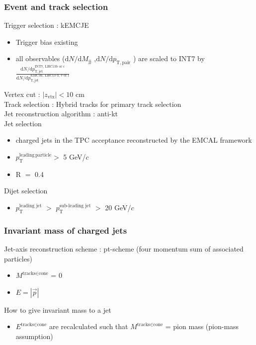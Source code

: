 \begin{frame}
\frametitle{Event and track selection}
Trigger selection : kEMCJE 
\begin{itemize}
\item Trigger bias existing
\item all observables ($\mathrm{d}N/\mathrm{d}M_\mathrm{jj}$ ,$\mathrm{d}N/\mathrm{d}p_\mathrm{T,pair}$ ) are scaled to INT7 by $\frac{\mathrm{d}N/\mathrm{d}p_\mathrm{T,jet}^{\textrm{INT7, LHC13b or c}}}{\mathrm{d}N/\mathrm{d}p_\mathrm{T,jet}^{\textrm{EMCJE, LHC13 d, e or f}}}$
\end{itemize}
Vertex cut : $|z_\mathrm{vtx}|<10$ cm\\

Track selection : Hybrid tracks for primary track selection\\

Jet reconstruction algorithm : anti-kt\\
Jet selection 
	\begin{itemize}
	\item{charged jets in the TPC acceptance reconstructed by the EMCAL framework }
	\item{$p_\mathrm{T}^\mathrm{leading\,particle}>$ 5 GeV/$c$}
	\item{R $=$ 0.4}
	\end{itemize}
	
Dijet selection 
	\begin{itemize}
		\item{ $p_\mathrm{T}^{\textrm{leading jet}}$ $>$  $p_\mathrm{T}^{\textrm{sub-leading jet}}$ $>$ 20 GeV/$c$}
	\end{itemize}

\end{frame}

	
\begin{frame}
\frametitle{Invariant mass of charged jets}
Jet-axis reconstruction scheme : pt-scheme (four momentum sum of associated particles)
\begin{itemize}
	\item{$M^{\textrm{tracks}\in \textrm{cone}}$ = 0}
	\item{$E = |\vec{p}|$}
\end{itemize}
How to give invariant mass to a jet
\begin{itemize}
	\item {$E^{\textrm{tracks} \in \textrm{cone}}$ are recalculated such that $M^{\textrm{tracks}\in \textrm{cone}}$ = pion mass} (pion-mass assumption)
\end{itemize}
\end{frame}

